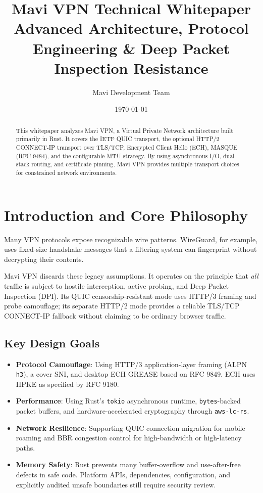 \documentclass[11pt,a4paper]{article}
\title{\textbf{Mavi VPN Technical Whitepaper}\\ \large Advanced Architecture, Protocol Engineering \& Deep Packet Inspection Resistance}
\author{Mavi Development Team}
\date{\today}
\begin{document}
\maketitle

\begin{abstract}
This whitepaper analyzes Mavi VPN, a Virtual Private Network architecture built primarily in Rust. It covers the IETF QUIC transport, the optional HTTP/2 CONNECT-IP transport over TLS/TCP, Encrypted Client Hello (ECH), MASQUE (RFC 9484), and the configurable MTU strategy. By using asynchronous I/O, dual-stack routing, and certificate pinning, Mavi VPN provides multiple transport choices for constrained network environments.
\end{abstract}

\tableofcontents
\newpage

\section{Introduction and Core Philosophy}

Many VPN protocols expose recognizable wire patterns. WireGuard, for example, uses fixed-size handshake messages that a filtering system can fingerprint without decrypting their contents.

Mavi VPN discards these legacy assumptions. It operates on the principle that \textit{all} traffic is subject to hostile interception, active probing, and Deep Packet Inspection (DPI). Its QUIC censorship-resistant mode uses HTTP/3 framing and probe camouflage; its separate HTTP/2 mode provides a reliable TLS/TCP CONNECT-IP fallback without claiming to be ordinary browser traffic.

\subsection{Key Design Goals}
\begin{itemize}
    \item \textbf{Protocol Camouflage}: Using HTTP/3 application-layer framing (ALPN \texttt{h3}), a cover SNI, and desktop ECH GREASE based on RFC 9849. ECH uses HPKE as specified by RFC 9180.
    \item \textbf{Performance}: Using Rust's \texttt{tokio} asynchronous runtime, \texttt{bytes}-backed packet buffers, and hardware-accelerated cryptography through \texttt{aws-lc-rs}.
    \item \textbf{Network Resilience}: Supporting QUIC connection migration for mobile roaming and BBR congestion control for high-bandwidth or high-latency paths.
    \item \textbf{Memory Safety}: Rust prevents many buffer-overflow and use-after-free defects in safe code. Platform APIs, dependencies, configuration, and explicitly audited unsafe boundaries still require security review.
\end{itemize}
\end{document}
